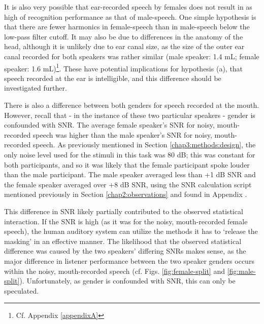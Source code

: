 It is also very possible that ear-recorded speech by females does not result in as high of recognition performance as that of male-speech.  One simple hypothesis is that there are fewer harmonics in female-speech than in male-speech below the low-pass filter cutoff.  It may also be due to differences in the anatomy of the head, although it is unlikely due to ear canal size, as the size of the outer ear canal recorded for both speakers was rather similar (male speaker: 1.4 mL; female speaker: 1.6 mL)\footnote{Cf. Appendix \DIFdelbegin {}\DIFdelend \ref{appendixA}}.  These have potential implications for hypothesis (a), that speech recorded at the ear is intelligible, and this difference should be investigated further.
%
%

There is also a difference between both genders for speech recorded at the mouth.
However, recall that - in the instance of these two particular speakers - gender is confounded with SNR.  The average female speaker's SNR for noisy, mouth-recorded speech was higher than the male speaker's SNR for noisy, mouth-recorded speech.  As previously mentioned in Section \ref{chap3:methods:design}, the only noise level used for the stimuli in this task was 80 dB; this was constant for both participants, and so it was likely that the female participant spoke louder than the male participant.  The male speaker averaged less than +1 dB SNR and the female speaker averaged over +8 dB SNR, using the SNR calculation script mentioned previously in Section \ref{chap2:observations} and found in Appendix \DIFdelbegin {}\DIFdelend \DIFaddbegin {}\DIFaddend .

This difference in SNR likely partially contributed to the observed statistical interaction.  If the SNR is high (as it was for the noisy, mouth-recorded female speech), the human auditory system can utilize the methods it has to `release the masking' in an effective manner.  The likelihood that the observed statistical difference was caused by the two speakers' differing SNRs makes sense, as the major difference in listener performance between the two speaker genders occurs within the noisy, mouth-recorded speech (cf. Figs. \ref{fig:female-split} and \ref{fig:male-split}).  Unfortunately, as gender is confounded with SNR, this can only be speculated.



